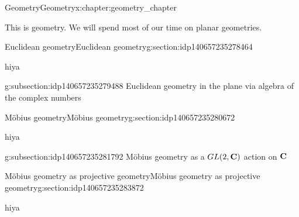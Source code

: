\documentclass[oneside,10pt,]{book}
\numberwithin{equation}{section}
\newcommand{\C}{{\rm \bf C}}
\begin{document}
\begin{chapterptx}{Geometry}{}{Geometry}{}{}{x:chapter:geometry_chapter}
\begin{introduction}{}%
This is geometry. We will spend most of our time on planar geometries.\end{introduction}%
%
%
\typeout{************************************************}
\typeout{************************************************}
%
\begin{sectionptx}{Euclidean geometry}{}{Euclidean geometry}{}{}{g:section:idp140657235278464}
\begin{introduction}{}%
hiya\end{introduction}%
%
%
\typeout{************************************************}
\typeout{************************************************}
%
\begin{subsectionptx}{}{}{}{}{}{g:subsection:idp140657235279488}
Euclidean geometry in the plane via algebra of the complex numbers%
\end{subsectionptx}
\end{sectionptx}
%
%
\typeout{************************************************}
\typeout{************************************************}
%
\begin{sectionptx}{Möbius geometry}{}{Möbius geometry}{}{}{g:section:idp140657235280672}
\begin{introduction}{}%
hiya\end{introduction}%
%
%
\typeout{************************************************}
\typeout{************************************************}
%
\begin{subsectionptx}{}{}{}{}{}{g:subsection:idp140657235281792}
Möbius geometry as a \(GL(2,\C)\) action on \(\C\)%
\end{subsectionptx}
\end{sectionptx}
%
%
\typeout{************************************************}
\typeout{************************************************}
%
\begin{sectionptx}{Möbius geometry as projective geometry}{}{Möbius geometry as projective geometry}{}{}{g:section:idp140657235283872}
\begin{introduction}{}%
hiya\end{introduction}%
%
%
\typeout{************************************************}

\end{sectionptx}
\end{chapterptx}
\end{document}

